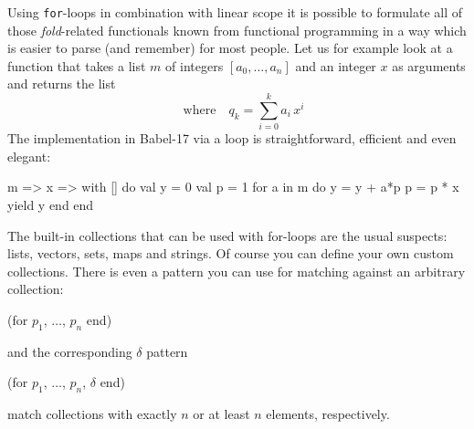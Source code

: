 \documentclass[11pt]{amsart}
\newcommand{\babelsrc}[1] {\lstinline!#1!}
\begin{document}
Using \babelsrc{for}-loops in combination with linear scope it is possible to formulate all of those \emph{fold}-related functionals known from functional programming in a way which is easier to parse (and remember) for most people. Let us for example look at a function that takes a list $m$ of integers $[a_0, \ldots, a_n]$ and an integer $x$ as arguments and returns the list
\begin{displaymath}
	[q_0, \ldots, q_n] \quad \text{where} \quad q_k = \sum_{i=0}^k a_i\, x^i
\end{displaymath}
The implementation in Babel-17 via a loop is straightforward, efficient and even elegant:
\begin{babellisting}
m => x => 
  with [] do 
    val y = 0
    val p = 1
    for a in m do 
      y = y + a*p
      p = p * x
      yield y
    end
 end
\end{babellisting}

The built-in collections that can be used with for-loops are the usual suspects: lists, vectors, sets, maps and strings. Of course you can define your own custom collections. There is even a pattern you can use for matching against an arbitrary collection:
\begin{babellisting}
(for $p_1$, $\ldots$, $p_n$ end)
\end{babellisting}
and the corresponding $\delta$ pattern
\begin{babellisting}
(for $p_1$, $\ldots$, $p_n$, $\delta$ end)
\end{babellisting}
match collections with exactly $n$ or at least $n$ elements, respectively. 
\end{document}

